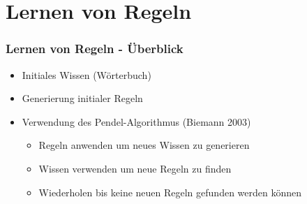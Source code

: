 \section{Lernen von Regeln}
\label{sec:itteratives-lernen}

\begin{frame}
  \frametitle{Lernen von Regeln - Überblick}

  \begin{itemize}
  \item Initiales Wissen (Wörterbuch)
  \item Generierung initialer Regeln
  \item Verwendung des Pendel-Algorithmus (Biemann 2003)
    \begin{itemize}
    \item Regeln anwenden um neues Wissen zu generieren
    \item Wissen verwenden um neue Regeln zu finden
    \item Wiederholen bis keine neuen Regeln gefunden werden können
    \end{itemize}
  \end{itemize}
\end{frame}